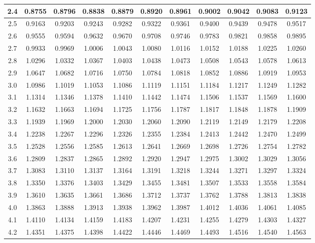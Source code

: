 {\begin{tabular}{|c|cccccccccc|}
2.4 & 0.8755 & 0.8796 & 0.8838 & 0.8879 & 0.8920 & 0.8961 & 0.9002 & 0.9042 & 0.9083 & 0.9123 \\
\hline
2.5 & 0.9163 & 0.9203 & 0.9243 & 0.9282 & 0.9322 & 0.9361 & 0.9400 & 0.9439 & 0.9478 & 0.9517 \\
2.6 & 0.9555 & 0.9594 & 0.9632 & 0.9670 & 0.9708 & 0.9746 & 0.9783 & 0.9821 & 0.9858 & 0.9895 \\
2.7 & 0.9933 & 0.9969 & 1.0006 & 1.0043 & 1.0080 & 1.0116 & 1.0152 & 1.0188 & 1.0225 & 1.0260 \\
2.8 & 1.0296 & 1.0332 & 1.0367 & 1.0403 & 1.0438 & 1.0473 & 1.0508 & 1.0543 & 1.0578 & 1.0613 \\
2.9 & 1.0647 & 1.0682 & 1.0716 & 1.0750 & 1.0784 & 1.0818 & 1.0852 & 1.0886 & 1.0919 & 1.0953 \\
\hline
3.0 & 1.0986 & 1.1019 & 1.1053 & 1.1086 & 1.1119 & 1.1151 & 1.1184 & 1.1217 & 1.1249 & 1.1282 \\
3.1 & 1.1314 & 1.1346 & 1.1378 & 1.1410 & 1.1442 & 1.1474 & 1.1506 & 1.1537 & 1.1569 & 1.1600 \\
3.2 & 1.1632 & 1.1663 & 1.1694 & 1.1725 & 1.1756 & 1.1787 & 1.1817 & 1.1848 & 1.1878 & 1.1909 \\
3.3 & 1.1939 & 1.1969 & 1.2000 & 1.2030 & 1.2060 & 1.2090 & 1.2119 & 1.2149 & 1.2179 & 1.2208 \\
3.4 & 1.2238 & 1.2267 & 1.2296 & 1.2326 & 1.2355 & 1.2384 & 1.2413 & 1.2442 & 1.2470 & 1.2499 \\
\hline
3.5 & 1.2528 & 1.2556 & 1.2585 & 1.2613 & 1.2641 & 1.2669 & 1.2698 & 1.2726 & 1.2754 & 1.2782 \\
3.6 & 1.2809 & 1.2837 & 1.2865 & 1.2892 & 1.2920 & 1.2947 & 1.2975 & 1.3002 & 1.3029 & 1.3056 \\
3.7 & 1.3083 & 1.3110 & 1.3137 & 1.3164 & 1.3191 & 1.3218 & 1.3244 & 1.3271 & 1.3297 & 1.3324 \\
3.8 & 1.3350 & 1.3376 & 1.3403 & 1.3429 & 1.3455 & 1.3481 & 1.3507 & 1.3533 & 1.3558 & 1.3584 \\
3.9 & 1.3610 & 1.3635 & 1.3661 & 1.3686 & 1.3712 & 1.3737 & 1.3762 & 1.3788 & 1.3813 & 1.3838 \\
\hline
4.0 & 1.3863 & 1.3888 & 1.3913 & 1.3938 & 1.3962 & 1.3987 & 1.4012 & 1.4036 & 1.4061 & 1.4085 \\
4.1 & 1.4110 & 1.4134 & 1.4159 & 1.4183 & 1.4207 & 1.4231 & 1.4255 & 1.4279 & 1.4303 & 1.4327 \\
4.2 & 1.4351 & 1.4375 & 1.4398 & 1.4422 & 1.4446 & 1.4469 & 1.4493 & 1.4516 & 1.4540 & 1.4563 \\

\end{tabular}}
